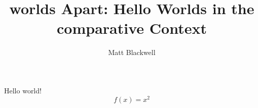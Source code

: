 \documentclass{article}
\title{worlds Apart: Hello Worlds in the comparative Context}
\author{Matt Blackwell}
\begin{document}
    \maketitle
    Hello world!
    $$f(x)=x^2$$
\end{document}
